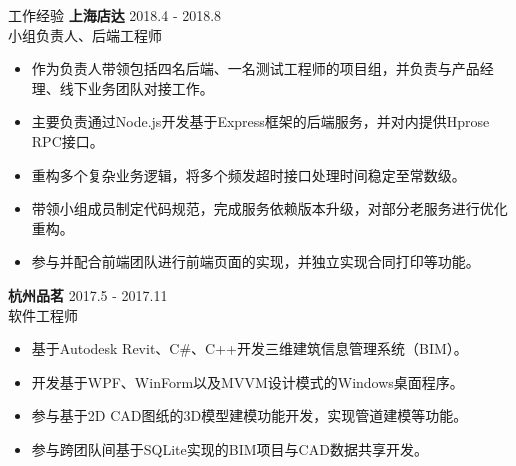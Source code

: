 \documentclass{resume} %
\begin{document}
\begin{rSection}{工作经验}
\textbf{上海店达} \hfill 2018.4 - 2018.8\\
小组负责人、后端工程师 \hfill \textit{}
\begin{itemize}
  \itemsep -3pt {}
  \item 作为负责人带领包括四名后端、一名测试工程师的项目组，并负责与产品经理、线下业务团队对接工作。
  \item 主要负责通过Node.js开发基于Express框架的后端服务，并对内提供Hprose RPC接口。
  \item 重构多个复杂业务逻辑，将多个频发超时接口处理时间稳定至常数级。
  \item 带领小组成员制定代码规范，完成服务依赖版本升级，对部分老服务进行优化重构。
  \item 参与并配合前端团队进行前端页面的实现，并独立实现合同打印等功能。
\end{itemize}

\textbf{杭州品茗} \hfill 2017.5 - 2017.11\\
软件工程师 \hfill \textit{}
\begin{itemize}
  \itemsep -3pt {}
  \item 基于Autodesk Revit、C\#、C++开发三维建筑信息管理系统（BIM）。
  \item 开发基于WPF、WinForm以及MVVM设计模式的Windows桌面程序。
  \item 参与基于2D CAD图纸的3D模型建模功能开发，实现管道建模等功能。
  \item 参与跨团队间基于SQLite实现的BIM项目与CAD数据共享开发。
\end{itemize}

\end{rSection}
\end{document}
